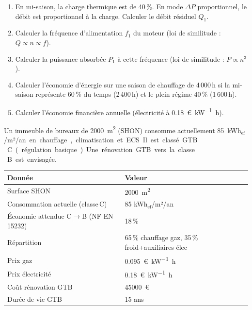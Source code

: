 \begin{enumerate}
  \item En mi-saison, la charge thermique est de 40\,\%. En mode $\Delta P$ proportionnel, le débit est proportionnel à la charge. Calculer le débit résiduel $Q_1$.
  \item Calculer la fréquence d'alimentation $f_1$ du moteur (loi de similitude : $Q \propto n \propto f$).
  \item Calculer la puissance absorbée $P_1$ à cette fréquence (loi de similitude : $P \propto n^3$).
  \item Calculer l'économie d'énergie sur une saison de chauffage de 4\,000\,h si la mi-saison représente 60\,\% du temps (2\,400\,h) et le plein régime 40\,\% (1\,600\,h).
  \item Calculer l'économie financière annuelle (électricité à \SI{0.18}{\euro\per\kilo\watt\hour}).
\end{enumerate}



Un immeuble de bureaux de \SI{2000}{\metre\squared} (SHON) consomme actuellement \SI{85}{kWh$_\text{ef}$/m²/an} en chauffage, climatisation et ECS. Il est classé GTB\,C (régulation basique). Une rénovation GTB vers la classe\,B est envisagée.

\begin{center}
\begin{tabular}{ll}
  \toprule
  Donnée & Valeur \\
  \midrule
  Surface SHON & \SI{2000}{\metre\squared} \\
  Consommation actuelle (classe\,C) & 85 kWh$_\text{ef}$/m²/an \\
  Économie attendue C$\to$B (NF EN 15232) & 18\,\% \\
  Répartition & 65\,\% chauffage gaz, 35\,\% froid+auxiliaires élec \\
  Prix gaz & \SI{0.095}{\euro\per\kilo\watt\hour} \\
  Prix électricité & \SI{0.18}{\euro\per\kilo\watt\hour} \\
  Coût rénovation GTB & \SI{45000}{\euro} \\
  Durée de vie GTB & 15 ans \\
  \bottomrule
\end{tabular}
\end{center}


